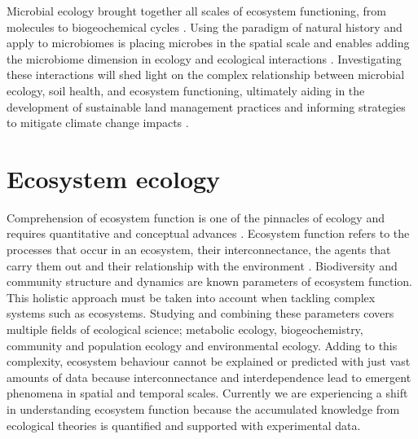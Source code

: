 Microbial ecology brought together all scales of ecosystem functioning, from
molecules to biogeochemical cycles \parencite{hall2018understanding,kempes2012Growth,raes2011molecular}.
Using the paradigm of natural history and apply to microbiomes \parencite{Fierer2006} is placing microbes
in the spatial scale and enables adding the microbiome dimension in ecology and ecological interactions \parencite{Martiny2006}.
Investigating these
interactions will shed light on the complex relationship between microbial
ecology, soil health, and ecosystem functioning, ultimately aiding in the
development of sustainable land management practices and informing strategies to mitigate climate change impacts \parencite{cavicchioli2019scientists}.


\section{Ecosystem ecology}
\label{sec:intro-ecosystem}

Comprehension of ecosystem function is one of the pinnacles of ecology and
requires quantitative and conceptual advances \parencite{Chapin_Matson_Vitousek_2011}.
Ecosystem function refers to the processes that occur in an ecosystem, their
interconnectance, the agents that carry them out
and their relationship with the environment \parencite{Chapin_Matson_Vitousek_2011}. Biodiversity
\parencite{hooperEFFECTSBIODIVERSITYECOSYSTEM2005, loreau2001Biodiversity}
and community structure and dynamics \parencite{gonze2018Microbial,morris2020linking}
are known parameters of ecosystem function. This holistic approach must be taken
into account when tackling complex systems such as ecosystems. Studying and
combining these parameters covers multiple fields of ecological science;
metabolic ecology, biogeochemistry, community and population ecology and
environmental ecology. Adding to this complexity, ecosystem behaviour cannot be
explained or predicted with just vast amounts of data because interconnectance
and interdependence lead to emergent phenomena in spatial and temporal scales.
Currently we are experiencing a shift in understanding ecosystem function
because the accumulated knowledge from ecological theories is quantified and
supported with experimental data.

